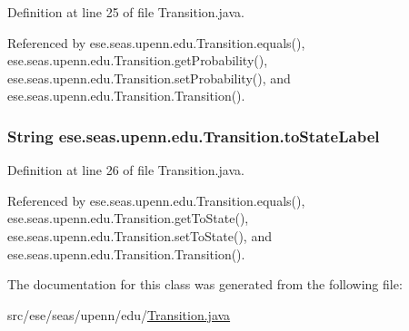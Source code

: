 Definition at line 25 of file Transition.\+java.



Referenced by ese.\+seas.\+upenn.\+edu.\+Transition.\+equals(), ese.\+seas.\+upenn.\+edu.\+Transition.\+get\+Probability(), ese.\+seas.\+upenn.\+edu.\+Transition.\+set\+Probability(), and ese.\+seas.\+upenn.\+edu.\+Transition.\+Transition().

\hypertarget{classese_1_1seas_1_1upenn_1_1edu_1_1_transition_a90ad793f29c7da83bccc4de524b9a28d}{}
\subsubsection[{to\+State\+Label}]{\setlength{\rightskip}{0pt plus 5cm}String ese.\+seas.\+upenn.\+edu.\+Transition.\+to\+State\+Label\hspace{0.3cm}{\ttfamily [private]}}\label{classese_1_1seas_1_1upenn_1_1edu_1_1_transition_a90ad793f29c7da83bccc4de524b9a28d}


Definition at line 26 of file Transition.\+java.



Referenced by ese.\+seas.\+upenn.\+edu.\+Transition.\+equals(), ese.\+seas.\+upenn.\+edu.\+Transition.\+get\+To\+State(), ese.\+seas.\+upenn.\+edu.\+Transition.\+set\+To\+State(), and ese.\+seas.\+upenn.\+edu.\+Transition.\+Transition().



The documentation for this class was generated from the following file\+:\begin{DoxyCompactItemize}
\item 
src/ese/seas/upenn/edu/\hyperlink{_transition_8java}{Transition.\+java}\end{DoxyCompactItemize}
